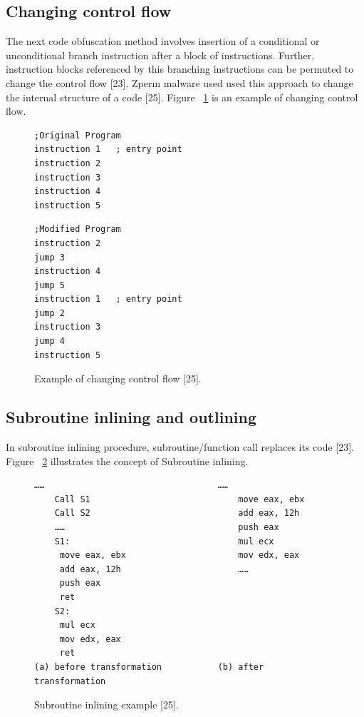 \subsection{Changing control flow} 
The next code obfuscation method involves insertion of a conditional or unconditional branch instruction after a block of instructions. Further, instruction blocks referenced by this branching instructions can be permuted to change the control flow [23]. Zperm malware used used this approach to change the internal structure of a code [25]. Figure ~\ref{fig:changecntflow} is an example of changing control flow.

\begin{figure}
  \centering
  \begin{lstlisting}[language=myasm]
;Original Program 
instruction 1   ; entry point
instruction 2
instruction 3
instruction 4
instruction 5
\end{lstlisting}

\begin{lstlisting}[language=myasm]
;Modified Program
instruction 2
jump 3
instruction 4
jump 5
instruction 1   ; entry point
jump 2
instruction 3
jump 4
instruction 5
\end{lstlisting}

    \caption[Example of changing control flow]{Example of changing control flow [25].}
    \label{fig:changecntflow}
\end{figure}

\subsection{Subroutine inlining and outlining} 
In subroutine inlining procedure, subroutine/function call replaces its code [23]. Figure ~\ref{fig:subroutineinline} illustrates the concept of Subroutine inlining. 

\begin{figure}
  \centering
  \begin{lstlisting}[language=myasm]
	……									……
	Call S1								move eax, ebx
	Call S2								add eax, 12h
	……									push eax
	S1: 								mul ecx
	 move eax, ebx						mov edx, eax
	 add eax, 12h						…… 
	 push eax					
	 ret						
	S2:							
	 mul ecx
	 mov edx, eax
	 ret
(a) before transformation			(b) after transformation
\end{lstlisting}


    \caption[Subroutine inlining example]{Subroutine inlining example [25].}
    \label{fig:subroutineinline}
\end{figure}

